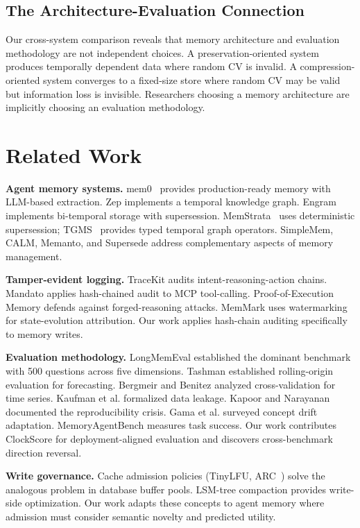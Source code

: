 \documentclass{llncs}
\begin{document}
\subsection{The Architecture-Evaluation Connection}
Our cross-system comparison reveals that memory architecture and evaluation methodology are not independent choices. A preservation-oriented system produces temporally dependent data where random CV is invalid. A compression-oriented system converges to a fixed-size store where random CV may be valid but information loss is invisible. Researchers choosing a memory architecture are implicitly choosing an evaluation methodology.


\section{Related Work}


\textbf{Agent memory systems.} mem0~\cite{mem0} provides production-ready memory with LLM-based extraction. Zep implements a temporal knowledge graph. Engram~\cite{engram} implements bi-temporal storage with supersession. MemStrata~\cite{memstrata} uses deterministic supersession; TGMS~\cite{tgms} provides typed temporal graph operators. SimpleMem, CALM,  Memanto, and Supersede address complementary aspects of memory management.

\textbf{Tamper-evident logging.} TraceKit audits intent-reasoning-action chains. Mandato applies hash-chained audit to MCP tool-calling. Proof-of-Execution Memory defends against forged-reasoning attacks. MemMark uses watermarking for state-evolution attribution. Our work applies hash-chain auditing specifically to memory writes.

\textbf{Evaluation methodology.} LongMemEval established the dominant benchmark with 500 questions across five dimensions. Tashman established rolling-origin evaluation for forecasting. Bergmeir and Benitez analyzed cross-validation for time series. Kaufman et al. formalized data leakage. Kapoor and Narayanan documented the reproducibility crisis. Gama et al. surveyed concept drift adaptation. MemoryAgentBench measures task success. Our work contributes ClockScore for deployment-aligned evaluation and discovers cross-benchmark direction reversal.

\textbf{Write governance.} Cache admission policies (TinyLFU, ARC~\cite{arc}) solve the analogous problem in database buffer pools. LSM-tree compaction provides write-side optimization. Our work adapts these concepts to agent memory where admission must consider semantic novelty and predicted utility.
\end{document}
